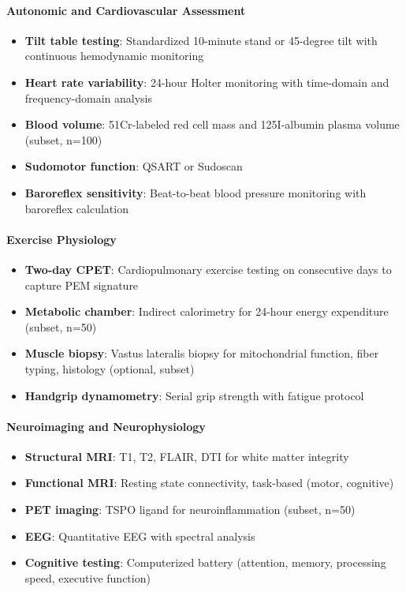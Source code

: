 \paragraph{Autonomic and Cardiovascular Assessment}
\begin{itemize}
    \item \textbf{Tilt table testing}: Standardized 10-minute stand or 45-degree tilt with continuous hemodynamic monitoring
    \item \textbf{Heart rate variability}: 24-hour Holter monitoring with time-domain and frequency-domain analysis
    \item \textbf{Blood volume}: 51Cr-labeled red cell mass and 125I-albumin plasma volume (subset, n=100)
    \item \textbf{Sudomotor function}: QSART or Sudoscan
    \item \textbf{Baroreflex sensitivity}: Beat-to-beat blood pressure monitoring with baroreflex calculation
\end{itemize}

\paragraph{Exercise Physiology}
\begin{itemize}
    \item \textbf{Two-day CPET}: Cardiopulmonary exercise testing on consecutive days to capture PEM signature
    \item \textbf{Metabolic chamber}: Indirect calorimetry for 24-hour energy expenditure (subset, n=50)
    \item \textbf{Muscle biopsy}: Vastus lateralis biopsy for mitochondrial function, fiber typing, histology (optional, subset)
    \item \textbf{Handgrip dynamometry}: Serial grip strength with fatigue protocol
\end{itemize}

\paragraph{Neuroimaging and Neurophysiology}
\begin{itemize}
    \item \textbf{Structural MRI}: T1, T2, FLAIR, DTI for white matter integrity
    \item \textbf{Functional MRI}: Resting state connectivity, task-based (motor, cognitive)
    \item \textbf{PET imaging}: TSPO ligand for neuroinflammation (subset, n=50)
    \item \textbf{EEG}: Quantitative EEG with spectral analysis
    \item \textbf{Cognitive testing}: Computerized battery (attention, memory, processing speed, executive function)
\end{itemize}

